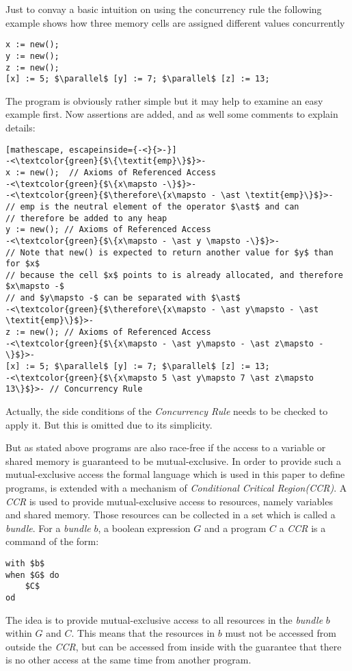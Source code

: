 	\begin{myexp}
	Just to convay a basic intuition on using the concurrency rule
	the following example shows how three memory cells are assigned
	different values concurrently
	\begin{lstlisting}[mathescape]
x := new();
y := new();
z := new();
[x] := 5; $\parallel$ [y] := 7; $\parallel$ [z] := 13;
	\end{lstlisting}
	The program is obviously rather simple but it may help to examine an
	easy example first. Now assertions are added, and as well some comments
	to explain details:
	\begin{lstlisting}[mathescape, escapeinside={-<}{>-}]
-<\textcolor{green}{$\{\textit{emp}\}$}>-
x := new();  // Axioms of Referenced Access
-<\textcolor{green}{$\{x\mapsto -\}$}>-
-<\textcolor{green}{$\therefore\{x\mapsto - \ast \textit{emp}\}$}>-
// emp is the neutral element of the operator $\ast$ and can 
// therefore be added to any heap
y := new(); // Axioms of Referenced Access
-<\textcolor{green}{$\{x\mapsto - \ast y \mapsto -\}$}>-
// Note that new() is expected to return another value for $y$ than for $x$
// because the cell $x$ points to is already allocated, and therefore $x\mapsto -$
// and $y\mapsto -$ can be separated with $\ast$
-<\textcolor{green}{$\therefore\{x\mapsto - \ast y\mapsto - \ast \textit{emp}\}$}>-
z := new(); // Axioms of Referenced Access
-<\textcolor{green}{$\{x\mapsto - \ast y\mapsto - \ast z\mapsto -\}$}>-
[x] := 5; $\parallel$ [y] := 7; $\parallel$ [z] := 13;
-<\textcolor{green}{$\{x\mapsto 5 \ast y\mapsto 7 \ast z\mapsto 13\}$}>- // Concurrency Rule
	\end{lstlisting}
	Actually, the side conditions of the \emph{Concurrency Rule} needs to be
	checked to apply it. But this is omitted due to its simplicity.
	\end{myexp}

	But as stated above programs are also race-free if the access to a variable
	or shared memory is guaranteed to be mutual-exclusive. In order to provide
	such a mutual-exclusive access
	the formal language which is used in this paper to define programs, is
	extended with a mechanism of \emph{Conditional Critical Region(CCR)}. A
	\emph{CCR} is used to provide mutual-exclusive access to resources, namely
	variables and shared memory.
	Those resources can be collected in a set which is called a \emph{bundle}.
	For a \emph{bundle} $b$, a boolean expression $G$ and a program $C$ a
	\emph{CCR} is a command of the form:
	\begin{lstlisting}[mathescape]
with $b$
when $G$ do
	$C$
od
	\end{lstlisting}
	The idea is to provide mutual-exclusive access to all resources in the
	\emph{bundle} $b$ within $G$ and $C$. This means that the 
	resources in $b$ must not be accessed from outside the \emph{CCR},
	but can be accessed from inside with the guarantee that there is no
	other access at the same time from another program.

